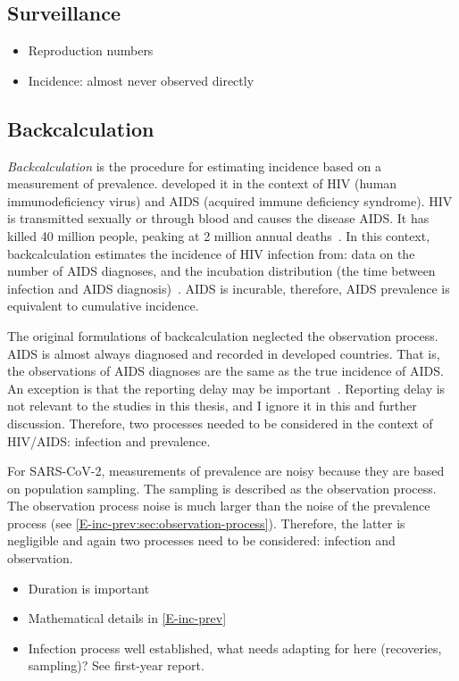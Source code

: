 \documentclass[thesis.tex]{subfiles}
\begin{document}
\subsection{Surveillance}

\begin{itemize}
    \item Reproduction numbers
    \item Incidence: almost never observed directly
\end{itemize}

\subsection{Backcalculation}

\emph{Backcalculation} is the procedure for estimating incidence based on a measurement of prevalence.
\Textcite{brookmeyerMethod} developed it in the context of HIV (human immunodeficiency virus) and AIDS (acquired immune deficiency syndrome).
HIV is transmitted sexually or through blood and causes the disease AIDS.
It has killed 40 million people, peaking at 2 million annual deaths~\autocite{unaids2023}.
In this context, backcalculation estimates the incidence of HIV infection from: data on the number of AIDS diagnoses, and the incubation distribution (the time between infection and AIDS diagnosis)~\autocite{brookmeyerBackcalculation,brookmeyerMeasuring}.
AIDS is incurable, therefore, AIDS prevalence is equivalent to cumulative incidence.


The original formulations of backcalculation neglected the observation process.
AIDS is almost always diagnosed and recorded in developed countries.
That is, the observations of AIDS diagnoses are the same as the true incidence of AIDS.
An exception is that the reporting delay may be important~\autocite{paganoHIV}.
Reporting delay is not relevant to the studies in this thesis, and I ignore it in this and further discussion.
Therefore, two processes needed to be considered in the context of HIV/AIDS: infection and prevalence.

For SARS-CoV-2, measurements of prevalence are noisy because they are based on population sampling.
The sampling is described as the observation process.
The observation process noise is much larger than the noise of the prevalence process (see \cref{E-inc-prev:sec:observation-process}).
Therefore, the latter is negligible and again two processes need to be considered: infection and observation.

\begin{itemize}
    \item Duration is important
    \item Mathematical details in \cref{E-inc-prev}
    \item Infection process well established, what needs adapting for here (recoveries, sampling)? See first-year report.
\end{itemize}
\end{document}
